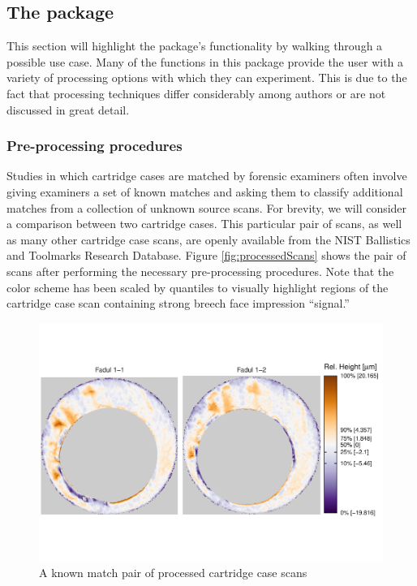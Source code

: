 \hypertarget{the-package}{%
\subsection{\texorpdfstring{The 
package}{The  package}}\label{the-package}}

This section will highlight the  package's functionality by
walking through a possible use case. Many of the functions in this
package provide the user with a variety of processing options with which
they can experiment. This is due to the fact that processing techniques
differ considerably among authors or are not discussed in great detail.

\hypertarget{pre-processing-procedures}{%
\subsubsection{Pre-processing
procedures}\label{pre-processing-procedures}}

Studies in which cartridge cases are matched by forensic examiners often
involve giving examiners a set of known matches and asking them to
classify additional matches from a collection of unknown source scans.
For brevity, we will consider a comparison between two cartridge cases.
This particular pair of scans, as well as many other cartridge case
scans, are openly available from the NIST Ballistics and Toolmarks
Research Database. Figure \ref{fig:processedScans} shows the pair of
scans after performing the necessary pre-processing procedures. Note
that the color scheme has been scaled by quantiles to visually highlight
regions of the cartridge case scan containing strong breech face
impression ``signal.''

\begin{Schunk}
\begin{figure}[htbp]

{\centering \includegraphics[width=1.2\textwidth,trim={0 2.5cm 0 2cm}]{cmcR_files/figure-latex/unnamed-chunk-6-1} 

}

\caption{\label{fig:processedScans} A known match pair of processed cartridge case scans}\label{fig:unnamed-chunk-6}
\end{figure}
\end{Schunk}

